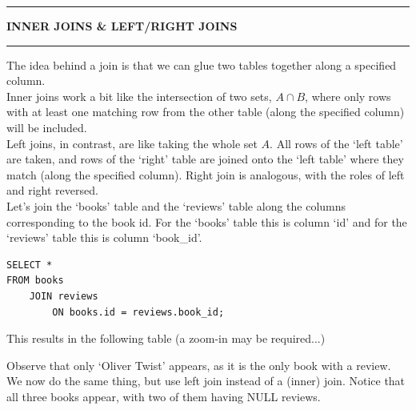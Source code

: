 \documentclass[8pt]{extarticle}
\newcommand{\heading}[1]{%
    \noindent
    \rule{\linewidth}{0.4pt}
    \begin{center}
        \vspace{-1ex}
        \textbf{#1}        
        \vspace{-2.5ex}
    \end{center}
    \rule{\linewidth}{0.4pt}
}
\begin{document}
\begin{multicols}{4}
\vspace{1ex}
\heading{INNER JOINS \& LEFT/RIGHT JOINS}

The idea behind a join is that we can glue two tables together along a specified column. \\

Inner joins work a bit like the intersection of two sets, $A \cap B$, where only rows with at least one matching row from the other table (along the specified column) will be included. \\

Left joins, in contrast, are like taking the whole set $A$. All rows of the `left table' are taken, and rows of the `right' table are joined onto the `left table' where they match (along the specified column). Right join is analogous, with the roles of left and right reversed.\\

Let's join the `books' table and the `reviews' table along the columns corresponding to the book id. For the `books' table this is column `id' and for the `reviews' table this is column `book\_id'.

\vspace{0.5ex}
\begin{lstlisting}[style=sql]
SELECT *
FROM books
    JOIN reviews
        ON books.id = reviews.book_id;
\end{lstlisting}
\vspace{0.5ex}

This results in the following table (a zoom-in may be required...)
\begin{center}
    \vspace{-1ex}
\end{center}

Observe that only `Oliver Twist' appears, as it is the only book with a review. We now do the same thing, but use left join instead of a (inner) join. Notice that all three books appear, with two of them having NULL reviews.


\end{multicols}
\end{document}
